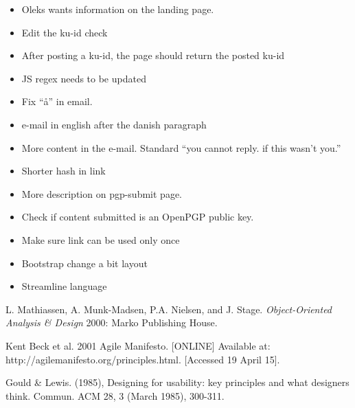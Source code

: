 \documentclass[11pt,a4paper]{report}
\begin{document}
\begin{appendices}
\begin{itemize}
\item Oleks wants information on the landing page.\\
\item Edit the ku-id check\\
\item After posting a ku-id, the page should return the posted ku-id\\
\item JS regex needs to be updated\\
\item Fix ``å'' in email.\\
\item e-mail in english after the danish paragraph\\
\item More content in the e-mail. Standard ``you cannot reply. if this wasn't you.''\\
\item Shorter hash in link\\
\item More description on pgp-submit page.\\
\item Check if content submitted is an OpenPGP public key.\\
\item Make sure link can be used only once\\
\item Bootstrap change a bit layout\\
\item Streamline language\\
\end{itemize}



\end{appendices}


\begin{thebibliography}{1}

 L. Mathiassen, A. Munk-Madsen, P.A. Nielsen, and J. Stage. {\em Object-Oriented Analysis \& Design} 2000: Marko Publishing House.

 Kent Beck et al. 2001 Agile Manifesto. [ONLINE] Available at: http://agilemanifesto.org/principles.html. [Accessed 19 April 15].

 Gould \& Lewis. (1985), Designing for usability: key principles and what designers think. Commun. ACM 28, 3 (March 1985), 300-311.




\end{thebibliography}
\end{document}
